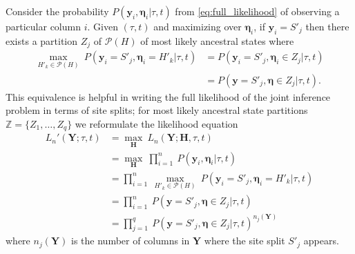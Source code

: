 \documentclass[a4paper]{article}
\newcommand{\fullAlignment}{\mathbf{Y}}
\newcommand{\alignmentColumn}{\mathbf{y}}
\newcommand{\siteSplit}{S'}
\newcommand{\fullAncestralStates}{\mathbf{H}}
\newcommand{\ancestralStateColumn}{\boldsymbol\eta}
\newcommand{\ancestralStateCategory}{Z}
\newcommand{\ancestralSplit}{H'}
\newcommand{\ancestralStateSet}{H}
\newcommand{\fullAncestralStateCategories}{\mathbb{Z}}
\newcommand{\nCols}{n}
\newcommand{\nSiteSplits}{q}
\begin{document}
Consider the probability $P(\alignmentColumn_i, \ancestralStateColumn_i | \tau, t)$ from \eqref{eq:full_likelihood} of observing a particular column $i$.
Given $(\tau, t)$ and maximizing over $\ancestralStateColumn_i$, if $\alignmentColumn_i=\siteSplit_j$ then there exists a partition $\ancestralStateCategory_j$ of $\mathcal{P}(\ancestralStateSet)$ of most likely ancestral states where
\begin{align*}
\max_{\ancestralSplit_k\in\mathcal{P}(\ancestralStateSet)} \ P(\alignmentColumn_i=\siteSplit_j, \ancestralStateColumn_i=\ancestralSplit_k | \tau, t) &= P(\alignmentColumn_i=\siteSplit_j, \ancestralStateColumn_i\in\ancestralStateCategory_j | \tau, t) \\
     &= P(\alignmentColumn=\siteSplit_j, \ancestralStateColumn\in\ancestralStateCategory_j | \tau, t).
\end{align*}
This equivalence is helpful in writing the full likelihood of the joint inference problem in terms of site splits; for most likely ancestral state partitions $\fullAncestralStateCategories=\{\ancestralStateCategory_1,\ldots,\ancestralStateCategory_\nSiteSplits\}$ we reformulate the likelihood equation
\begin{align}
L_\nCols'(\fullAlignment;\tau, t) &= \max_{\fullAncestralStates} \ L_\nCols(\fullAlignment;\fullAncestralStates, \tau, t) \\
                             &= \max_{\fullAncestralStates} \ \prod_{i=1}^{\nCols} \ P(\alignmentColumn_i, \ancestralStateColumn_i | \tau, t) \\
                             &= \prod_{i=1}^{\nCols} \ \max_{\ancestralSplit_k\in\mathcal{P}(\ancestralStateSet)} \ P(\alignmentColumn_i=\siteSplit_j, \ancestralStateColumn_i=\ancestralSplit_k | \tau, t) \\
                             &= \prod_{i=1}^{\nCols} \ P(\alignmentColumn=\siteSplit_j, \ancestralStateColumn\in\ancestralStateCategory_j | \tau, t) \\
                             &= \prod_{j=1}^{\nSiteSplits} \ P(\alignmentColumn=\siteSplit_j, \ancestralStateColumn\in\ancestralStateCategory_j | \tau, t)^{\nCols_j(\fullAlignment)} \label{eq:site_pattern_likelihood}
\end{align}
where $\nCols_j(\fullAlignment)$ is the number of columns in $\fullAlignment$ where the site split $\siteSplit_j$ appears.
\end{document}

